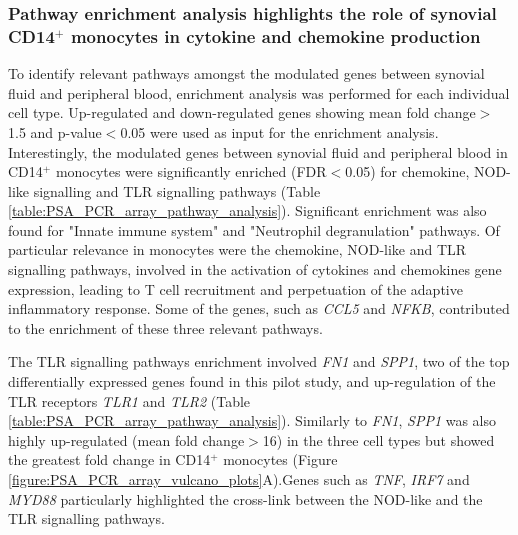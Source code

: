 \subsubsection{Pathway enrichment analysis highlights the role of synovial CD14$^+$ monocytes in cytokine and chemokine production}
To identify relevant pathways amongst the modulated genes between synovial fluid and peripheral blood, enrichment analysis was performed for each individual cell type. Up-regulated and down-regulated genes showing mean fold change$>$1.5 and p-value$<$0.05 were used as input for the enrichment analysis. Interestingly, the modulated genes between synovial fluid and peripheral blood in CD14$^+$ monocytes were significantly enriched (FDR$<$0.05) for chemokine, NOD-like signalling and TLR signalling pathways (Table \ref{table:PSA_PCR_array_pathway_analysis}). Significant enrichment was also found for "Innate immune system" and "Neutrophil degranulation" pathways. Of particular relevance in monocytes were the chemokine, NOD-like and TLR signalling pathways, involved in the activation of cytokines and chemokines gene expression, leading to T cell recruitment and perpetuation of the adaptive inflammatory response. Some of the genes, such as \textit{CCL5} and \textit{NFKB}, contributed to the enrichment of these three relevant pathways.

The TLR signalling pathways enrichment involved \textit{FN1} and \textit{SPP1}, two of the top differentially expressed genes found in this pilot study, and up-regulation of the TLR receptors \textit{TLR1} and \textit{TLR2} (Table \ref{table:PSA_PCR_array_pathway_analysis}). Similarly to \textit{FN1}, \textit{SPP1} was also highly up-regulated (mean fold change$>$16) in the three cell types but showed the greatest fold change in CD14$^+$ monocytes (Figure \ref{figure:PSA_PCR_array_vulcano_plots}A).Genes such as \textit{TNF}, \textit{IRF7} and \textit{MYD88} particularly highlighted the cross-link between the NOD-like and the TLR signalling pathways. 


